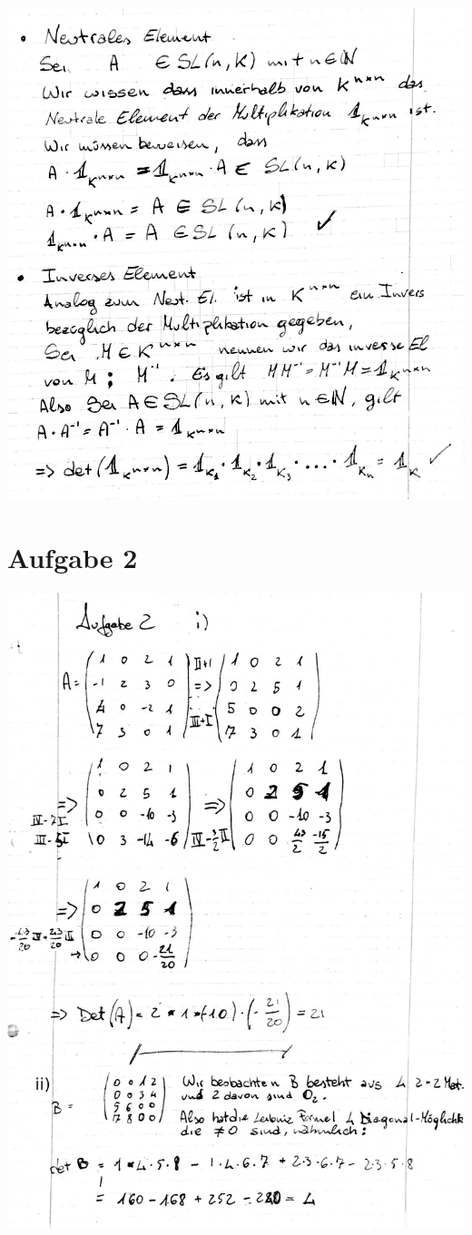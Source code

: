 \documentclass[10pt,a4paper]{article}
\begin{document}
\includegraphics[scale=0.2]{la_t12_2.jpg} \\
\newpage
\section{Aufgabe 2}
\includegraphics[scale=1]{la_t12_3.jpg} 
\end{document}
